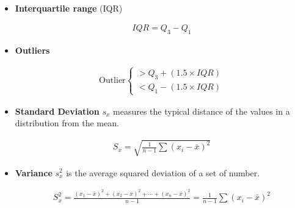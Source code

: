 \documentclass[Main.tex]{subfiles}
\begin{document}
	\begin{exercise} \hfill \\
		
		\begin{itemize}
			\item \textbf{Interquartile range} (IQR)
			\begin{definition}			
				\begin{subequations}
					\begin{align}
						IQR=Q_{3}-Q_{1}
					\end{align}
				\end{subequations}
			\end{definition}\hfill
			
			\item \textbf{Outliers}
			\begin{definition}[Outlier]
				\begin{subequations}
					\begin{align}
						\text{Outlier}
						\begin{cases}
							>Q_{3}+(1.5\times IQR)\\
							<Q_{1}-(1.5\times IQR)
						\end{cases}
					\end{align}
				\end{subequations}
			\end{definition}\hfill
			
			\item \textbf{Standard Deviation}  $s_{x}$ measures the typical distance of the values in  a distribution from the mean.
			\begin{definition}			
				\begin{subequations}
					\begin{align}
						S_{x}=\sqrt{\frac{1}{n-1}\sum(x_{i}-\bar{x})^{2}}
					\end{align}
				\end{subequations}
			\end{definition}\hfill
			
			\item \textbf{Variance} $s^{2}_{x}$  is the average squared deviation of a set of number.
			\begin{definition}[Variance]			
				\begin{subequations}
					\begin{align}
						S^{2}_{x}=\frac{(x_{1}-\bar{x})^{2}+(x_{2}-\bar{x})^{2}+\cdots+(x_{n}-\bar{x})^{2}}{n-1}=\frac{1}{n-1}\sum(x_{i}-\bar{x})^{2}
					\end{align}
				\end{subequations}
			\end{definition}\hfill
		\end{itemize}						
	\end{exercise}
	
\end{document}
